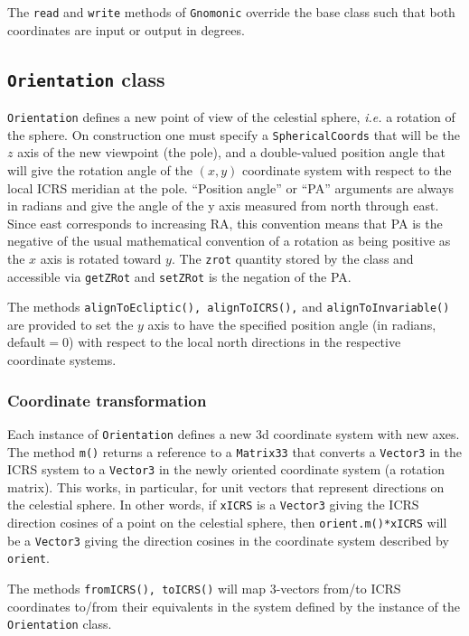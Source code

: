 \documentclass[11pt,preprint,flushrt]{aastex}
\begin{document}
The {\tt read} and {\tt write} methods of {\tt Gnomonic} override the base class such that both coordinates are input or output in degrees.

\subsection{{\tt Orientation} class}
{\tt Orientation} defines a new point of view of the celestial sphere, {\it i.e.} a rotation of the sphere.  On construction one must specify a {\tt SphericalCoords} that will be the $z$ axis of the new viewpoint (the pole), and a double-valued position angle that will give the rotation angle of the $(x,y)$ coordinate system with respect to the local ICRS meridian at the pole.  ``Position angle'' or ``PA'' arguments are always in radians and give the angle of the y axis measured from north through east.  Since east corresponds to increasing RA, this convention means that PA is the negative of the usual mathematical convention of a rotation as being positive as the $x$ axis is rotated toward $y$.  The {\tt zrot} quantity stored by the class and accessible via {\tt getZRot} and {\tt setZRot} is the negation of the PA.

The methods {\tt alignToEcliptic(), alignToICRS(),} and {\tt alignToInvariable()} are provided to set the $y$ axis to have the specified position angle (in radians, default$=0$) with respect to the local north directions in the respective coordinate systems.  

\subsubsection{Coordinate transformation}
Each instance of {\tt Orientation} defines a new 3d coordinate system with new axes.  The method {\tt m()} returns a reference to a {\tt Matrix33} that converts a {\tt Vector3} in the ICRS system to a {\tt Vector3} in the newly oriented coordinate system (a rotation matrix).  This works, in particular, for unit vectors that represent directions on the celestial sphere.  In other words, if {\tt xICRS} is a {\tt Vector3} giving the ICRS direction cosines of a point on the celestial sphere, then {\tt orient.m()*xICRS} will be a {\tt Vector3} giving the direction cosines in the coordinate system described by {\tt orient}.

The methods {\tt fromICRS(), toICRS()} will map 3-vectors from/to ICRS coordinates to/from their equivalents in the system defined by the instance of the {\tt Orientation} class.
\end{document}
